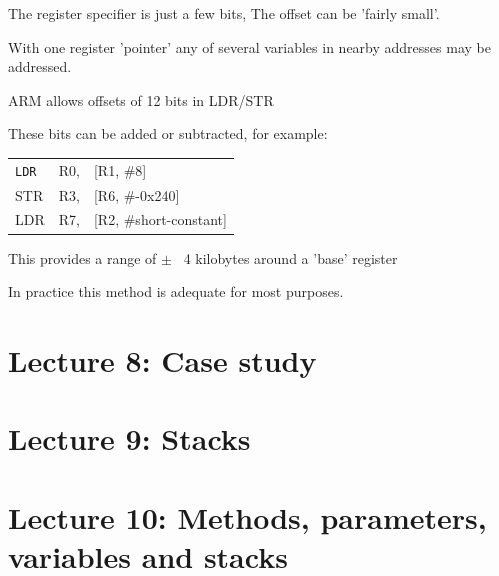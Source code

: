 \documentclass{article}
\begin{document}
The register specifier is just a few bits, The offset can be 'fairly small'.

With one register 'pointer' any of several variables in nearby addresses may be addressed.

ARM allows offsets of 12 bits in LDR/STR

These bits can be added or subtracted, for example:

\begin{center}
    \begin{tabular}{l l l}
        {\tt LDR} & R0, & [R1, \#8] \\
        STR & R3, & [R6, \#-0x240]\\
        LDR & R7, & [R2, \#short-constant]
    \end{tabular}
\end{center}

This provides a range of $\pm$ ~4 kilobytes around a 'base' register

In practice this method is adequate for most purposes. 

\section{Lecture 8: Case study}
\section{Lecture 9: Stacks}
\section{Lecture 10: Methods, parameters, variables and stacks}
\end{document}
